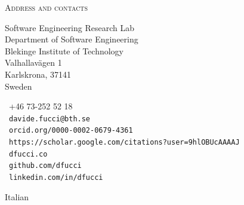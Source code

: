 \documentclass[9pt]{article}
\makeatletter
\def\myemail{davide.fucci@bth.se}
\def\myweb{dfucci.co}
\def\mygithub{github.com/dfucci}
\def\myphone{+46 73-252 52 18}
\def\mygscholar{https://scholar.google.com/citations?user=9hlOBUcAAAAJ}
\def\myorcid{orcid.org/0000-0002-0679-4361}
\def\mylinkedin{linkedin.com/in/dfucci}
\makeatother
\begin{document}
  \reversemarginpar
  \noindent\textsc{Address and contacts}\\
    \begin{minipage}[t]{2in}
{\footnotesize Software Engineering Research Lab\vspace{-0.04in}\\
  \noindent Department of Software Engineering \vspace{-0.04in}\\
    \noindent Blekinge Institute of Technology \vspace{-0.01in}\\
    \noindent Valhallavägen 1 \vspace{-0.04in}\\
    \noindent Karlskrona, 37141 \vspace{-0.04in}\\
    \noindent Sweden
}
\end{minipage}
\begin{minipage}[t]{1.7in}
{\footnotesize \faPhone~\myphone \\
  \noindent \faEnvelope~\texttt{\myemail}\vspace{-0.03in}\\
    \noindent \aiOrcid~\texttt{\myorcid} \vspace{-0.03in}\\
    \noindent \aiGoogleScholar~\texttt{\mygscholar} \vspace{-0.20in}\\
    \noindent \faSitemap~\texttt{\myweb} \vspace{-0.03in}\\
    \noindent \faGithub~\texttt{\mygithub} \vspace{-0.03in}\\
    \noindent  \faLinkedin~\texttt{\mylinkedin}\vspace{-0.03in}\\
}
\end{minipage}


\bigskip
\bigskip
\bigskip
\flushleft

\medskip
\bigskip


\noindent Italian

\medskip

\textheight=580pt
\end{document}
